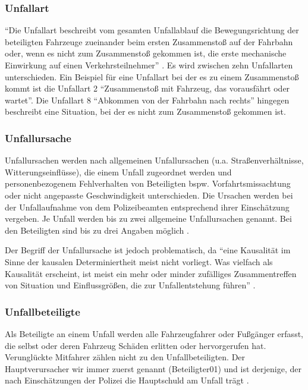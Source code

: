 \subsubsection{Unfallart}
\enquote{Die Unfallart beschreibt vom gesamten Unfallablauf die Bewegungsrichtung der beteiligten Fahrzeuge zueinander beim ersten Zusammenstoß auf der Fahrbahn oder, wenn es nicht zum Zusammenstoß gekommen ist, die erste mechanische Einwirkung auf einen Verkehrsteilnehmer} \parencite[S. 17]{StatistischesBundesamt.2018b}. Es wird zwischen zehn Unfallarten unterschieden. Ein Beispiel für eine Unfallart bei der es zu einem Zusammenstoß kommt ist die Unfallart 2 \enquote{Zusammenstoß mit Fahrzeug, das vorausfährt oder wartet}. Die Unfallart 8 \enquote{Abkommen von der Fahrbahn nach rechts} hingegen beschreibt eine Situation, bei der es nicht zum Zusammenstoß gekommen ist.

\subsubsection{Unfallursache}
Unfallursachen werden nach allgemeinen Unfallursachen (u.a. Straßenverhältnisse, Witterungseinflüsse), die einem Unfall zugeordnet werden und personenbezogenem Fehlverhalten von Beteiligten bspw. Vorfahrtsmissachtung oder nicht angepasste Geschwindigkeit unterschieden. Die Ursachen werden bei der Unfallaufnahme von dem Polizeibeamten entsprechend ihrer Einschätzung vergeben. Je Unfall werden bis zu zwei allgemeine Unfallursachen genannt. Bei den Beteiligten sind bis zu drei Angaben möglich \parencite[S. 12]{StatistischesBundesamt.2018b}.

Der Begriff der Unfallursache ist jedoch problematisch, da \enquote{eine Kausalität im Sinne der kausalen Determiniertheit meist nicht vorliegt. Was vielfach als Kausalität erscheint, ist meist ein mehr oder minder zufälliges Zusammentreffen von Situation und Einflussgrößen, die zur Unfallentstehung führen} \parencite[S. 3]{Reichart.2001}.

\subsubsection{Unfallbeteiligte}
Als Beteiligte an einem Unfall werden alle Fahrzeugfahrer oder Fußgänger erfasst, die selbst oder deren Fahrzeug Schäden erlitten oder hervorgerufen hat. Verunglückte Mitfahrer zählen nicht zu den Unfallbeteiligten. Der Hauptverursacher wir immer zuerst genannt (Beteiligter01) und ist derjenige, der nach Einschätzungen der Polizei die Hauptschuld am Unfall trägt \parencite[S. 12]{StatistischesBundesamt.2018b}.

